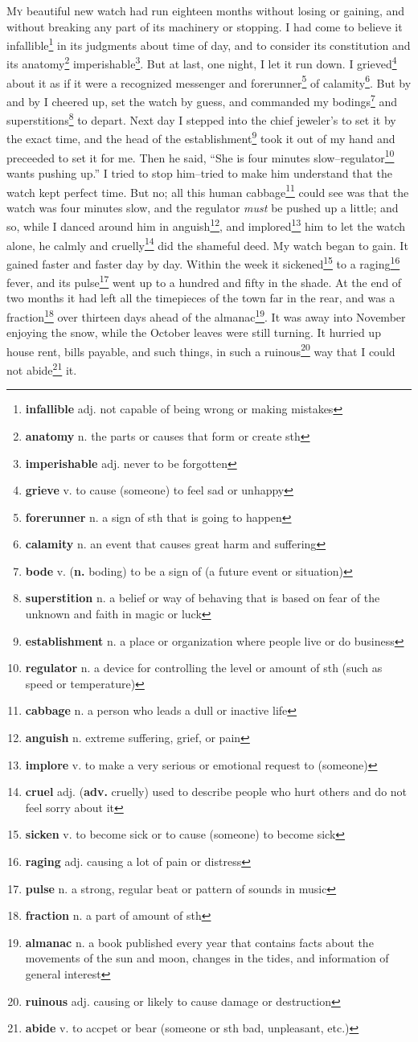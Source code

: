 \lettrine{M}{y} beautiful new watch had run eighteen months without losing or gaining, and without breaking any part of its machinery or stopping. I had come to believe it infallible\footnote{\textbf{infallible} adj. not capable of being wrong or making mistakes} in its judgments about time of day, and to consider its constitution and its anatomy\footnote{\textbf{anatomy} n. the parts or causes that form or create sth} imperishable\footnote{\textbf{imperishable} adj. never to be forgotten}. But at last, one night, I let it run down. I grieved\footnote{\textbf{grieve} v. to cause (someone) to feel sad or unhappy} about it as if it were a recognized messenger and forerunner\footnote{\textbf{forerunner} n. a sign of sth that is going to happen} of calamity\footnote{\textbf{calamity} n. an event that causes great harm and suffering}. But by and by I cheered up, set the watch by guess, and commanded my bodings\footnote{\textbf{bode} v. (\textbf{n.} boding) to be a sign of (a future event or situation)} and superstitions\footnote{\textbf{superstition} n. a belief or way of behaving that is based on fear of the unknown and faith in magic or luck} to depart. Next day I stepped into the chief jeweler's to set it by the exact time, and the head of the establishment\footnote{\textbf{establishment} n. a place or organization where people live or do business} took it out of my hand and preceeded to set it for me. Then he said, ``She is four minutes slow--regulator\footnote{\textbf{regulator} n. a device for controlling the level or amount of sth (such as speed or temperature)} wants pushing up.'' I tried to stop him--tried to make him understand that the watch kept perfect time. But no; all this human cabbage\footnote{\textbf{cabbage} n. a person who leads a dull or inactive life} could see was that the watch was four minutes slow, and the regulator \textit{must} be pushed up a little; and so, while I danced around him in anguish\footnote{\textbf{anguish} n. extreme suffering, grief, or pain}, and implored\footnote{\textbf{implore} v. to make a very serious or emotional request to (someone)} him to let the watch alone, he calmly and cruelly\footnote{\textbf{cruel} adj. (\textbf{adv.} cruelly) used to describe people who hurt others and do not feel sorry about it} did the shameful deed. My watch began to gain. It gained faster and faster day by day. Within the week it sickened\footnote{\textbf{sicken} v. to become sick or to cause (someone) to become sick} to a raging\footnote{\textbf{raging} adj. causing a lot of pain or distress} fever, and its pulse\footnote{\textbf{pulse} n. a strong, regular beat or pattern of sounds in music} went up to a hundred and fifty in the shade. At the end of two months it had left all the timepieces of the town far in the rear, and was a fraction\footnote{\textbf{fraction} n. a part of amount of sth} over thirteen days ahead of the almanac\footnote{\textbf{almanac} n. a book published every year that contains facts about the movements of the sun and moon, changes in the tides, and information of general interest}. It was away into November enjoying the snow, while the October leaves were still turning. It hurried up house rent, bills payable, and such things, in such a ruinous\footnote{\textbf{ruinous} adj. causing or likely to cause damage or destruction} way that I could not abide\footnote{\textbf{abide} v. to accpet or bear (someone or sth bad, unpleasant, etc.)} it.
